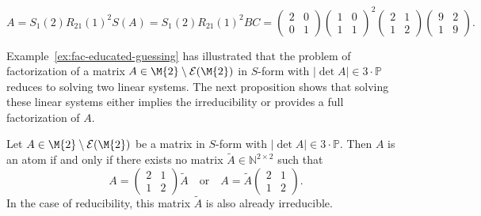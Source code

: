 \begin{example}
\[ A = S_1(2)R_{21}(1)^2 S(A)=S_1(2)R_{21}(1)^2BC = \begin{pmatrix} 2 & 0 \\ 0 & 1 \end{pmatrix}\begin{pmatrix} 1 & 0 \\ 1 & 1 \end{pmatrix}^2\begin{pmatrix} 2 & 1 \\ 1 & 2 \end{pmatrix}\begin{pmatrix} 9 & 2 \\ 1 & 9 \end{pmatrix}. \]
\end{example}

Example~\ref{ex:fac-educated-guessing} has illustrated that the problem of factorization of a matrix $A \in \M{2}\setminus\mathcal{E}(\M{2})$ in $S$-form with $\left \lvert \det{A} \right \rvert \in 3 \cdot \mathbb{P}$ reduces to solving two linear systems. The next proposition shows that solving these linear systems either implies the irreducibility or provides a full factorization of $A$.

\begin{proposition}
Let $A \in \M{2}\setminus\mathcal{E}(\M{2})$ be a matrix in $S$-form with $\left \lvert \det{A} \right \rvert  \in 3 \cdot \mathbb{P}$. Then $A$ is an atom if and only if there exists no matrix $\tilde{A} \in \mathbb{N}^{2 \times 2}$ such that 
\[A = \begin{pmatrix} 2 & 1 \\ 1 & 2 \end{pmatrix}\tilde{A} \quad \text{or} \quad A = \tilde{A} \begin{pmatrix} 2 & 1 \\ 1 & 2\end{pmatrix}.\]
In the case of reducibility, this matrix $\tilde{A}$ is also already irreducible.
\end{proposition}

